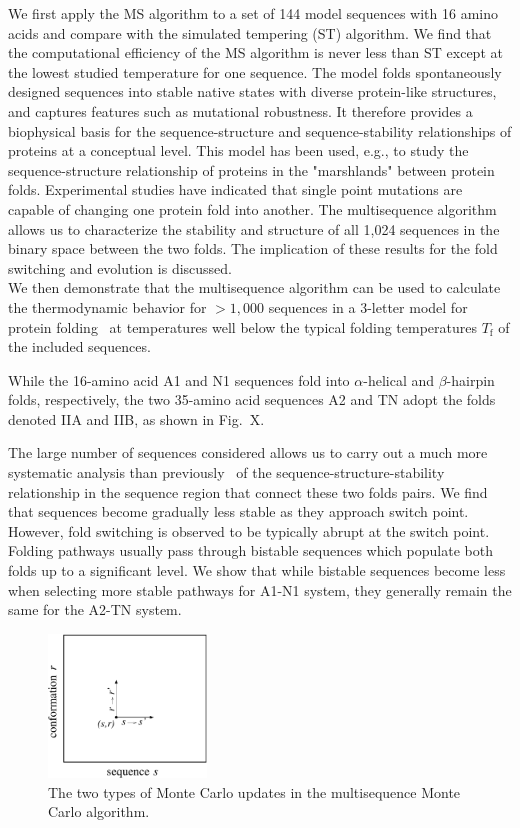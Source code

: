 \documentclass[%
 aip,
rsi,%
 amsmath,amssymb,
 reprint,%
]{revtex4-1}
\begin{document}
We first apply the MS algorithm to a set of 144 model sequences with 16 amino acids and compare with the simulated tempering (ST) algorithm. We find that the computational efficiency of the MS algorithm is never less than ST except at the lowest studied temperature for one sequence. The model folds spontaneously designed sequences into stable native states with diverse protein-like structures, and captures features such as mutational robustness. It therefore provides a biophysical basis for the sequence-structure and sequence-stability relationships of proteins at a conceptual level. This model has been used, e.g., to study the sequence-structure relationship of proteins in the "marshlands" between protein folds. Experimental studies have indicated that single point mutations are capable of changing one protein fold into another. The multisequence algorithm allows us to characterize the stability and structure of all 1,024 sequences in the binary space between the two folds. The implication of these results for the fold switching and evolution is discussed. \\

We then demonstrate that the multisequence algorithm can be used to calculate the thermodynamic behavior for $>1,000$ sequences in a 3-letter model for protein folding~\cite{Bhattacherjee2012} at temperatures well below the typical folding temperatures $T_\mathrm{f}$ of the included sequences.  

While the 16-amino acid A1 and N1 sequences fold into $\alpha$-helical and $\beta$-hairpin folds, respectively, the two 35-amino acid sequences A2 and TN adopt the folds denoted IIA and IIB, as shown in Fig.~X. 

The large number of sequences considered allows us to carry out a much more systematic analysis than previously~\cite{Holzgrafe2014,Holzgrafe2015} of the sequence-structure-stability relationship in the sequence region that connect these two folds pairs. We find that sequences become gradually less stable as they approach switch point. However, fold switching is observed to be typically abrupt at the switch point. Folding pathways usually pass through bistable sequences which populate both folds up to a significant level. We show that while bistable sequences become less when selecting more stable pathways for A1-N1 system, they generally remain the same for the A2-TN system.


\begin{figure}
\includegraphics[width=4.2cm]{Fig1}
\caption{The two types of Monte Carlo updates in the multisequence Monte Carlo algorithm.}
\end{figure}
\end{document}
